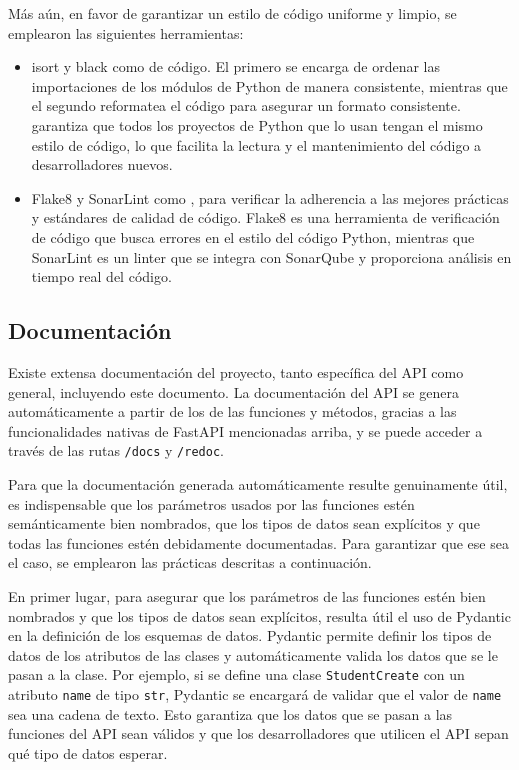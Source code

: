 Más aún, en favor de garantizar un estilo de código uniforme y limpio, se emplearon las siguientes herramientas:
\begin{itemize}
	\item \gls{isort} y \gls{black} como  de código. El primero se encarga de ordenar las importaciones de los módulos de \gls{Python} de manera consistente, mientras que el segundo reformatea el código para asegurar un formato consistente.  garantiza que todos los proyectos de \gls{Python} que lo usan tengan el mismo estilo de código, lo que facilita la lectura y el mantenimiento del código a desarrolladores nuevos.
	\item \gls{Flake8} y \gls{SonarLint} como , para verificar la adherencia a las mejores prácticas y estándares de calidad de código. \gls{Flake8} es una herramienta de verificación de código que busca errores en el estilo del código \gls{Python}, mientras que \gls{SonarLint} es un \gls{linter} que se integra con \gls{SonarQube} y proporciona análisis en tiempo real del código.
\end{itemize}

\subsection{Documentación}

Existe extensa documentación del proyecto, tanto específica del API como general, incluyendo este documento. La documentación del \gls{API} se genera automáticamente a partir de los  de las funciones y métodos, gracias a las funcionalidades nativas de \gls{FastAPI} mencionadas arriba, y se puede acceder a través de las rutas \verb|/docs| y \verb|/redoc|.

Para que la documentación generada automáticamente resulte genuinamente útil, es indispensable que los parámetros usados por las funciones estén semánticamente bien nombrados, que los tipos de datos sean explícitos y que todas las funciones estén debidamente documentadas. Para garantizar que ese sea el caso, se emplearon las prácticas descritas a continuación.

En primer lugar, para asegurar que los parámetros de las funciones estén bien nombrados y que los tipos de datos sean explícitos, resulta útil el uso de \gls{Pydantic} en la definición de los esquemas de datos. \gls{Pydantic} permite definir los tipos de datos de los atributos de las clases y automáticamente valida los datos que se le pasan a la clase. Por ejemplo, si se define una clase \texttt{StudentCreate} con un atributo \texttt{name} de tipo \texttt{str}, \gls{Pydantic} se encargará de validar que el valor de \texttt{name} sea una cadena de texto. Esto garantiza que los datos que se pasan a las funciones del \gls{API} sean válidos y que los desarrolladores que utilicen el \gls{API} sepan qué tipo de datos esperar.


